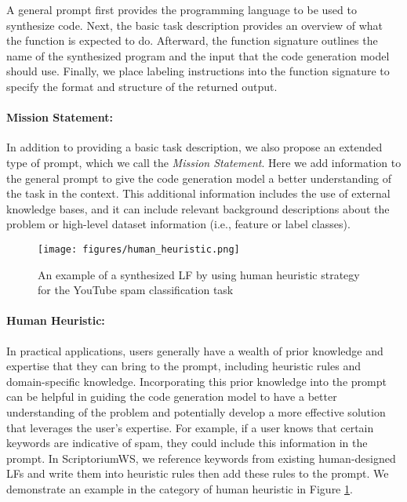 A general prompt first provides the programming language to be used to synthesize code. 
%
Next, the basic task description provides an overview of what the function is expected to do.
%
Afterward, the function signature outlines the name of the synthesized program and the input that the code generation model should use.
%
Finally, we place labeling instructions into the function signature to specify the format and structure of the returned output.


\paragraph{Mission Statement:}
In addition to providing a basic task description, we also propose an extended type of prompt, which we call the \emph{Mission Statement}. Here we add information to the general prompt to give the code generation model a better understanding of the task in the context. This additional information includes the use of external knowledge bases, and it can include relevant background descriptions about the problem or high-level dataset information (i.e., feature or label classes).

\begin{figure}
    \centering
    \texttt{[image: figures/human\_heuristic.png]}
    \caption{An example of a synthesized LF by using human heuristic strategy for the YouTube spam classification task}
    \label{fig:hh}
\end{figure}

\paragraph{Human Heuristic:}
In practical applications, users generally have a wealth of prior knowledge and expertise that they can bring to the prompt, including heuristic rules and domain-specific knowledge. Incorporating this prior knowledge into the prompt can be helpful in guiding the code generation model to have a better understanding of the problem and potentially develop a more effective solution that leverages the user's expertise. For example, if a user knows that certain keywords are indicative of spam, they could include this information in the prompt. In ScriptoriumWS, we reference keywords from existing human-designed LFs and write them into heuristic rules then add these rules to the prompt. We demonstrate an example in the category of human heuristic in Figure \ref{fig:hh}.

